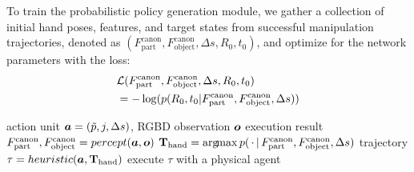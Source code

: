 To train the probabilistic policy generation module, we gather a collection of initial hand poses, features, and target states from successful manipulation trajectories, denoted as  $(F^{\text{canon}}_{\text{part}}, F^{\text{canon}}_{\text{object}}, \Delta s, R_0, t_0)$, and optimize for the network parameters with the loss: 
\begin{align*}
    &{\mathcal{L}}(F^{\text{canon}}_{\text{part}}, F^{\text{canon}}_{\text{object}}, \Delta s, R_0, t_0) \\
    &= -\log(p(R_0, t_0| F^{\text{canon}}_{\text{part}}, F^{\text{canon}}_{\text{object}}, \Delta s))
\end{align*}
%


\begin{algorithm}
    \caption{Part Manipulation Generator}\label{alg:part_manip}
    \begin{algorithmic}[1]
    \Require action unit ${\bm{a}} = (\tilde{p}, j, \Delta s)$, RGBD observation ${\bm{o}}$ %
    \Ensure execution result %
    \State $F^{\text{canon}}_{\text{part}}, F^{\text{canon}}_{\text{object}} = percept({\bm{a}}, {\bm{o}})$ 
    \State ${\mathbf{T}}_{\text{hand}} = \operatorname*{arg\!max}{p(\,\cdot\,|\, F^{\text{canon}}_{\text{part}}, F^{\text{canon}}_{\text{object}}, \Delta s)} $
    \State trajectory $\tau = heuristic({\bm{a}}, {\mathbf{T}}_{\text{hand}})$ 
    \State execute $\tau$ with a physical agent 
    \end{algorithmic}
\end{algorithm}

